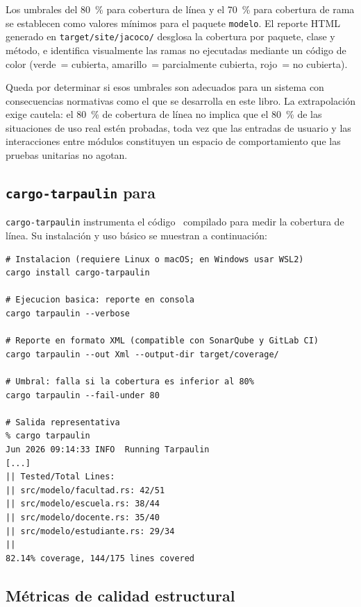 \noindent
Los umbrales del 80~\% para cobertura de línea y el 70~\% para cobertura de rama se
establecen como valores mínimos para el paquete \texttt{modelo}. El reporte HTML generado
en \texttt{target/site/jacoco/} desglosa la cobertura por paquete, clase y método, e
identifica visualmente las ramas no ejecutadas mediante un código de color
(verde~= cubierta, amarillo~= parcialmente cubierta, rojo~= no cubierta).

Queda por determinar si esos umbrales son adecuados para un sistema con consecuencias
normativas como el que se desarrolla en este libro. La extrapolación exige cautela:
el 80~\% de cobertura de línea no implica que el 80~\% de las situaciones de uso real
estén probadas, toda vez que las entradas de usuario y las interacciones entre módulos
constituyen un espacio de comportamiento que las pruebas unitarias no agotan.

\subsection{\texttt{cargo-tarpaulin} para \rust}
\label{subsec:tarpaulin}

\texttt{cargo-tarpaulin} instrumenta el código \rust\ compilado para medir la cobertura
de línea. Su instalación y uso básico se muestran a continuación:

\begin{lstlisting}[style=rustStyle,
  caption={Instalación y ejecución de \texttt{cargo-tarpaulin}.},
  label={lst:tarpaulin-uso}]
# Instalacion (requiere Linux o macOS; en Windows usar WSL2)
cargo install cargo-tarpaulin

# Ejecucion basica: reporte en consola
cargo tarpaulin --verbose

# Reporte en formato XML (compatible con SonarQube y GitLab CI)
cargo tarpaulin --out Xml --output-dir target/coverage/

# Umbral: falla si la cobertura es inferior al 80%
cargo tarpaulin --fail-under 80

# Salida representativa
% cargo tarpaulin
Jun 2026 09:14:33 INFO  Running Tarpaulin
[...]
|| Tested/Total Lines:
|| src/modelo/facultad.rs: 42/51
|| src/modelo/escuela.rs: 38/44
|| src/modelo/docente.rs: 35/40
|| src/modelo/estudiante.rs: 29/34
||
82.14% coverage, 144/175 lines covered
\end{lstlisting}

\subsection{Métricas de calidad estructural}
\label{subsec:metricas-calidad}

